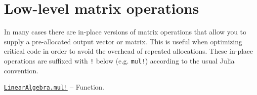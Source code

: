 \hypertarget{4687212954685590607}{}


\section{Low-level matrix operations}



In many cases there are in-place versions of matrix operations that allow you to supply a pre-allocated output vector or matrix.  This is useful when optimizing critical code in order to avoid the overhead of repeated allocations. These in-place operations are suffixed with \texttt{!} below (e.g. \texttt{mul!}) according to the usual Julia convention.


\hypertarget{364008531309780709}{}
\hyperlink{364008531309780709}{\texttt{LinearAlgebra.mul!}}  -- {Function.}


